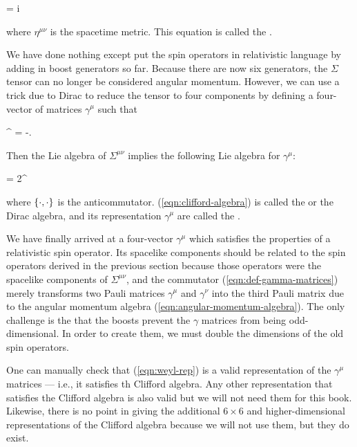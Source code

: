\begin{e}
  \brackets{\Sigma^{\mu\nu},\Sigma^{\rho\sigma}} = i\parens{\eta^{\nu\sigma}\Sigma^{\mu\rho} + \eta^{\mu\rho}\Sigma^{\nu\sigma} -\eta^{\mu\sigma}\Sigma^{\nu\rho} - \eta^{\nu\rho}\Sigma^{\mu\sigma}}
  \label{eqn:lorentz-algebra}
\end{e}
where $\eta^{\mu\nu}$ is the spacetime metric. This equation is called the .

We have done nothing except put the spin operators in relativistic language by adding in boost generators so far. Because there are now six generators, the $\Sigma$ tensor can no longer be considered angular momentum. However, we can use a trick due to Dirac to reduce the tensor to four components by defining a four-vector of matrices $\gamma^\mu$ such that
\begin{e}
  \Sigma^{\mu\nu} = -\brackets{\gamma^\mu, \gamma^\nu}.
  \label{eqn:def-gamma-matrices}
\end{e}
Then the Lie algebra of $\Sigma^{\mu\nu}$ implies the following Lie algebra for $\gamma^\mu$:
\begin{e}
  \braces{\gamma^\mu, \gamma^\nu} = 2\eta^{\mu\nu}
  \label{eqn:clifford-algebra}
\end{e}
where $\left\{\cdot,\cdot\right\}$ is the anticommutator. (\ref{eqn:clifford-algebra}) is called the  or the Dirac algebra, and its representation $\gamma^\mu$ are called the .

We have finally arrived at a four-vector $\gamma^\mu$ which satisfies the properties of a relativistic spin operator. Its spacelike components should be related to the spin operators derived in the previous section because those operators were the spacelike components of $\Sigma^{\mu\nu}$, and the commutator (\ref{eqn:def-gamma-matrices}) merely transforms two Pauli matrices $\gamma^\mu$ and $\gamma^\nu$ into the third Pauli matrix due to the angular momentum algebra (\ref{eqn:angular-momentum-algebra}). The only challenge is the that the boosts prevent the $\gamma$ matrices from being odd-dimensional. In order to create them, we must double the dimensions of the old spin operators.

One can manually check that (\ref{eqn:weyl-rep}) is a valid representation of the $\gamma^\mu$ matrices --- i.e., it satisfies th Clifford algebra. Any other representation that satisfies the Clifford algebra is also valid but we will not need them for this book. Likewise, there is no point in giving the additional $6\times 6$ and higher-dimensional representations of the Clifford algebra because we will not use them, but they do exist.

